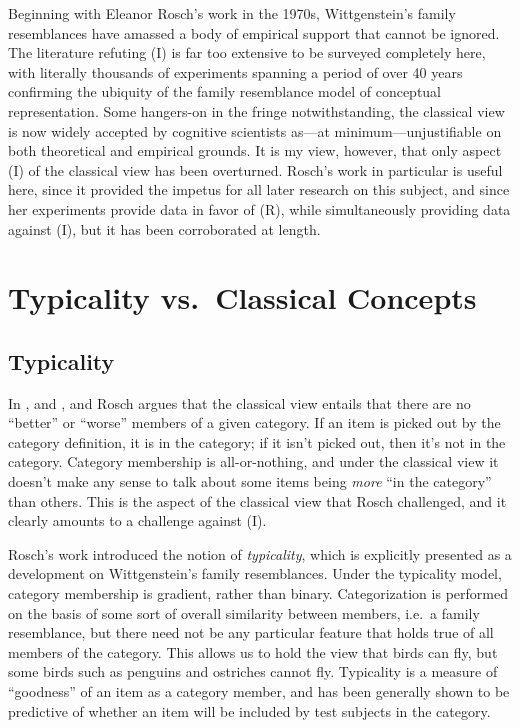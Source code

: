 Beginning with Eleanor Rosch's work in the 1970s, Wittgenstein's family resemblances have amassed a body of empirical support that cannot be ignored. The literature refuting (I) is far too extensive to be surveyed completely here, with literally thousands of experiments spanning a period of over 40 years confirming the ubiquity of the family resemblance model of conceptual representation. Some hangers-on in the fringe notwithstanding, the classical view is now widely accepted by cognitive scientists as---at minimum---unjustifiable on both theoretical and empirical grounds. It is my view, however, that only aspect (I) of the classical view has been overturned. Rosch's work in particular is useful here, since it provided the impetus for all later research on this subject, and since her experiments provide data in favor of (R), while simultaneously providing data against (I), but it has been corroborated at length.

\section{Typicality vs.\ Classical Concepts}

\subsection{Typicality} In \cite{rosch_natural_1973}, and \cite{rosch_family_1975}, and \cite{rosch_principles_1978} Rosch argues that the classical view entails that there are no ``better'' or ``worse'' members of a given category. If an item is picked out by the category definition, it is in the category; if it isn't picked out, then it's not in the category. Category membership is all-or-nothing, and under the classical view it doesn't make any sense to talk about some items being \emph{more} ``in the category'' than others. This is the aspect of the classical view that Rosch challenged, and it clearly amounts to a challenge against (I).

Rosch's work introduced the notion of \emph{typicality}, which is explicitly presented as a development on Wittgenstein's family resemblances. Under the typicality model, category membership is gradient, rather than binary. Categorization is performed on the basis of some sort of overall similarity between members, i.e.\ a family resemblance, but there need not be any particular feature that holds true of all members of the category. This allows us to hold the view that birds can fly, but some birds such as penguins and ostriches cannot fly. Typicality is a measure of ``goodness'' of an item as a category member, and has been generally shown to be predictive of whether an item will be included by test subjects in the category.

